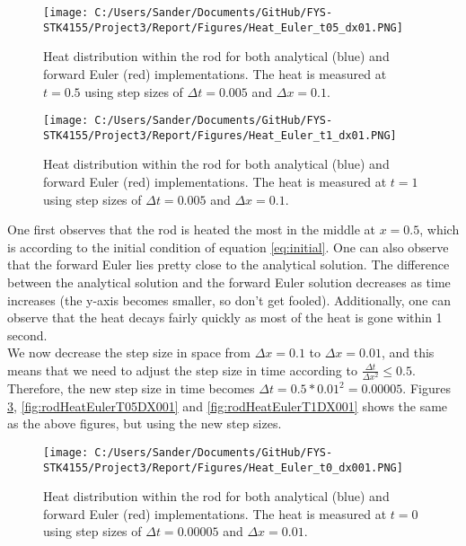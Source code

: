 \documentclass[12pt,a4paper]{article}
\begin{document}
\begin{figure}[H]
\centering
\texttt{[image: C:/Users/Sander/Documents/GitHub/FYS-STK4155/Project3/Report/Figures/Heat\_Euler\_t05\_dx01.PNG]}
\caption{\label{fig:rodHeatEulerT05DX01} Heat distribution within the rod for both analytical (blue) and forward Euler (red) implementations. The heat is measured at $t = 0.5$ using step sizes of $\Delta t = 0.005$ and $\Delta x = 0.1$.}
\end{figure}

\begin{figure}[H]
\centering
\texttt{[image: C:/Users/Sander/Documents/GitHub/FYS-STK4155/Project3/Report/Figures/Heat\_Euler\_t1\_dx01.PNG]}
\caption{\label{fig:rodHeatEulerT1DX01} Heat distribution within the rod for both analytical (blue) and forward Euler (red) implementations. The heat is measured at $t = 1$ using step sizes of $\Delta t = 0.005$ and $\Delta x = 0.1$.}
\end{figure}

\noindent One first observes that the rod is heated the most in the middle at $x = 0.5$, which is according to the initial condition of equation \ref{eq:initial}. One can also observe that the forward Euler lies pretty close to the analytical solution. The difference between the analytical solution and the forward Euler solution decreases as time increases (the y-axis becomes smaller, so don't get fooled). Additionally, one can observe that the heat decays fairly quickly as most of the heat is gone within 1 second. 
\\
We now decrease the step size in space from $\Delta x = 0.1$ to $\Delta x = 0.01$, and this means that we need to adjust the step size in time according to $\frac{\Delta t}{\Delta x^2} \leq 0.5$. Therefore, the new step size in time becomes $\Delta t = 0.5*0.01^2 = 0.00005$. Figures \ref{fig:rodHeatEulerT0DX001}, \ref{fig:rodHeatEulerT05DX001} and \ref{fig:rodHeatEulerT1DX001} shows the same as the above figures, but using the new step sizes.

\begin{figure}[H]
\centering
\texttt{[image: C:/Users/Sander/Documents/GitHub/FYS-STK4155/Project3/Report/Figures/Heat\_Euler\_t0\_dx001.PNG]}
\caption{\label{fig:rodHeatEulerT0DX001} Heat distribution within the rod for both analytical (blue) and forward Euler (red) implementations. The heat is measured at $t = 0$ using step sizes of $\Delta t = 0.00005$ and $\Delta x = 0.01$.}
\end{figure}
\end{document}
